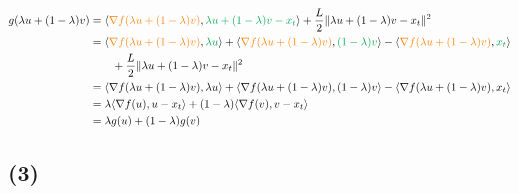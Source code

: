 \documentclass{article}
\begin{document}
\begin{align*}
    g(\lambda u + (1 - \lambda) v) 
    &= \langle \textcolor{orange}{\nabla f(\lambda u + (1 - \lambda) v)}, \textcolor{Green}{\lambda u + (1 - \lambda) v - x_t} \rangle + \frac{L}{2} \Vert \lambda u + (1 - \lambda) v - x_t \Vert^2 \\
    &= \langle \textcolor{orange}{\nabla f(\lambda u + (1 - \lambda) v)}, \textcolor{Green}{\lambda u} \rangle + \langle \textcolor{orange}{\nabla f(\lambda u + (1 - \lambda) v)}, \textcolor{Green}{(1 - \lambda) v} \rangle - \langle \textcolor{orange}{\nabla f(\lambda u + (1 - \lambda) v)}, \textcolor{Green}{x_t} \rangle \\
    &\qquad + \frac{L}{2} \Vert \lambda u + (1 - \lambda) v - x_t \Vert^2 \\
    &= \langle \nabla f(\lambda u + (1 - \lambda) v), \lambda u \rangle + \langle \nabla f(\lambda u + (1 - \lambda) v), (1 - \lambda) v \rangle - \langle \nabla f(\lambda u + (1 - \lambda) v), x_t \rangle \\
    &= \lambda \langle \nabla f(u), u - x_t \rangle + (1 - \lambda) \langle \nabla f(v), v - x_t \rangle \\
    &= \lambda g(u) + (1 - \lambda) g(v)
\end{align*}



\subsection*{(3)}
\end{document}
